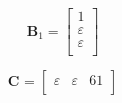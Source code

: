 \documentclass[11pt, a4paper, fleqn]{article}
\begin{document}
\begin{equation*}
\mathbf{B}_{1} = 
\left[\begin{array}{ c }
1\\
\varepsilon\\
\varepsilon\\
\end{array}\right]
\end{equation*}

\begin{equation*}
\mathbf{C}_{{}} = 
\left[\begin{array}{ ccc }
\varepsilon	&\varepsilon	&61\\
\end{array}\right]
\end{equation*}
\end{document}
